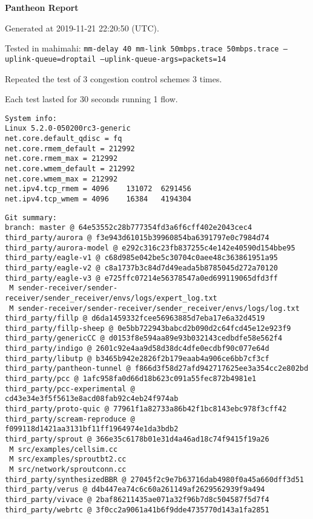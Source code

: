 \documentclass{article}
\begin{document}
\centerline{\textbf{\large{Pantheon Report}}}
\vspace{20pt}

Generated at 2019-11-21 22:20:50 (UTC).

Tested in mahimahi: \texttt{mm-delay 40 mm-link 50mbps.trace 50mbps.trace --uplink-queue=droptail --uplink-queue-args=packets=14}

Repeated the test of 3 congestion control schemes 3 times.

Each test lasted for 30 seconds running 1 flow.

\begin{verbatim}
System info:
Linux 5.2.0-050200rc3-generic
net.core.default_qdisc = fq
net.core.rmem_default = 212992
net.core.rmem_max = 212992
net.core.wmem_default = 212992
net.core.wmem_max = 212992
net.ipv4.tcp_rmem = 4096	131072	6291456
net.ipv4.tcp_wmem = 4096	16384	4194304
\end{verbatim}

\begin{verbatim}
Git summary:
branch: master @ 64e53552c28b777354fd3a6f6cff402e2043cec4
third_party/aurora @ f3e943d61015b39960854ba6391797e0c7984d74
third_party/aurora-model @ e292c316c23fb837255c4e142e40590d154bbe95
third_party/eagle-v1 @ c68d985e042be5c30704c0aee48c363861951a95
third_party/eagle-v2 @ c8a1737b3c84d7d49eada5b8785045d272a70120
third_party/eagle-v3 @ e725ffc07214e56378547a0ed699119065dfd3ff
 M sender-receiver/sender-receiver/sender_receiver/envs/logs/expert_log.txt
 M sender-receiver/sender-receiver/sender_receiver/envs/logs/log.txt
third_party/fillp @ d6da1459332fcee56963885d7eba17e6a32d4519
third_party/fillp-sheep @ 0e5bb722943babcd2b090d2c64fcd45e12e923f9
third_party/genericCC @ d0153f8e594aa89e93b032143cedbdfe58e562f4
third_party/indigo @ 2601c92e4aa9d58d38dc4dfe0ecdbf90c077e64d
third_party/libutp @ b3465b942e2826f2b179eaab4a906ce6bb7cf3cf
third_party/pantheon-tunnel @ f866d3f58d27afd942717625ee3a354cc2e802bd
third_party/pcc @ 1afc958fa0d66d18b623c091a55fec872b4981e1
third_party/pcc-experimental @ cd43e34e3f5f5613e8acd08fab92c4eb24f974ab
third_party/proto-quic @ 77961f1a82733a86b42f1bc8143ebc978f3cff42
third_party/scream-reproduce @ f099118d1421aa3131bf11ff1964974e1da3bdb2
third_party/sprout @ 366e35c6178b01e31d4a46ad18c74f9415f19a26
 M src/examples/cellsim.cc
 M src/examples/sproutbt2.cc
 M src/network/sproutconn.cc
third_party/synthesizedBBR @ 27045f2c9e7b63716dab4980f0a45a660dff3d51
third_party/verus @ d4b447ea74c6c60a261149af2629562939f9a494
third_party/vivace @ 2baf86211435ae071a32f96b7d8c504587f5d7f4
third_party/webrtc @ 3f0cc2a9061a41b6f9dde4735770d143a1fa2851
\end{verbatim}
\end{document}
